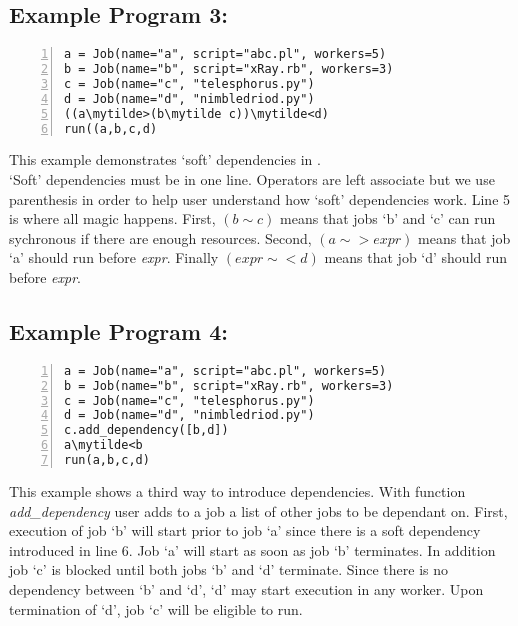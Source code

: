 \subsection*{Example Program 3:}
\begin{Verbatim}[numbers=left,commandchars=\\\{\}]
a = Job(name="a", script="abc.pl", workers=5)
b = Job(name="b", script="xRay.rb", workers=3)
c = Job(name="c", "telesphorus.py")
d = Job(name="d", "nimbledriod.py")
((a\mytilde>(b\mytilde c))\mytilde<d)
run((a,b,c,d)
\end{Verbatim}

This example demonstrates `soft' dependencies in \lang{}.\\
`Soft' dependencies must be in one line. Operators
are left associate but we use parenthesis in order to help
user understand how `soft' dependencies work. Line 5 is where all
magic happens. First, $(b\sim c)$ means that jobs `b' and `c' can run 
sychronous if there are enough resources. Second,
$(a\sim>expr)$ means that job `a' should run before \textit{expr}. 
Finally $(expr\sim<d)$ means that job `d' should run before \textit{expr}.

\subsection*{Example Program 4:}
\begin{Verbatim}[numbers=left,commandchars=\\\{\}]
a = Job(name="a", script="abc.pl", workers=5)
b = Job(name="b", script="xRay.rb", workers=3)
c = Job(name="c", "telesphorus.py")
d = Job(name="d", "nimbledriod.py")
c.add_dependency([b,d])
a\mytilde<b
run(a,b,c,d)
\end{Verbatim}

This example shows a third way to introduce dependencies.
With function \textit{add\_dependency} user adds to a job
a list of other jobs to be dependant on. First, execution of job `b' 
will start prior to job `a' since there is a soft dependency introduced 
in line 6. Job `a' will start as soon as job `b' terminates.
In addition job `c' is blocked until both jobs `b' and `d' terminate.
Since there is no dependency between `b' and `d', `d' may start execution  
in any worker. Upon termination of `d', job `c' will be eligible to run.
